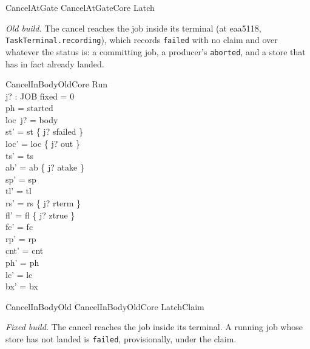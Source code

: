\documentclass[a4paper,10pt,fleqn]{article}
\newcommand{\field}[1]{\texttt{#1}}
\begin{document}
\begin{zed}
CancelAtGate  CancelAtGateCore \land Latch
\end{zed}

\emph{Old build.} The cancel reaches the job inside its terminal
(at eaa5118, \field{TaskTerminal.recording}), which records \field{failed} with no claim and
over whatever the status is: a committing job, a producer's \field{aborted}, and
a store that has in fact already landed.

\begin{schema}{CancelInBodyOldCore}
\Delta Run \\ j? : JOB
\where
fixed = 0 \\
ph = started \\
loc~j? = body \\
st' = st \oplus \{ j? \mapsto sfailed \} \\
loc' = loc \oplus \{ j? \mapsto out \} \\
ts' = ts \\
ab' = ab \oplus \{ j? \mapsto atake \} \\
sp' = sp \\
tl' = tl \\
rs' = rs \oplus \{ j? \mapsto rterm \} \\
fl' = fl \oplus \{ j? \mapsto ztrue \} \\
fc' = fc \\
rp' = rp \\
cnt' = cnt \\
ph' = ph \\
lc' = lc \\
bx' = bx
\end{schema}

\begin{zed}
CancelInBodyOld  CancelInBodyOldCore \land LatchClaim
\end{zed}

\emph{Fixed build.} The cancel reaches the job inside its terminal. A running
job whose store has not landed is \field{failed}, provisionally, under the
claim.
\end{document}

